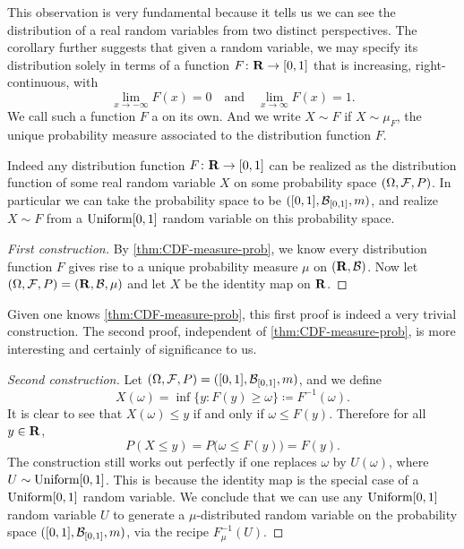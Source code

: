 This observation is very fundamental because it tells us we can see the distribution of a real random variables from two distinct perspectives. The corollary further suggests that given a random variable, we may specify its distribution solely in terms of a function $F\colon \mathbf{R} \to [0,1]$ that is increasing, right-continuous, with \[
        \lim_{x \to -\infty} F(x) = 0\quad \text{and} \quad \lim_{x \to \infty} F(x) = 1.
\] We call such a function $F$ a  on its own. And we write $X \sim F$ if $X \sim \mu_F$, the unique probability measure associated to the distribution function $F$.

\begin{thm} \label{thm:cdf-unif-identification}
    Indeed any distribution function $F \colon \mathbf{R} \to [0,1]$ can be realized as the distribution function of some real random variable $X$ on some probability space $(\Omega,\mathcal{F},P)$. In particular we can take the probability space to be $([0,1],\mathcal{B}_{[0,1]},m)$, and realize $X \sim F$ from a $\operatorname{Uniform}[0,1]$ random variable on this probability space.
\end{thm}
\begin{proof}[First construction]
    By \cref{thm:CDF-measure-prob}, we know every distribution function $F$ gives rise to a unique probability measure $\mu$ on $(\mathbf{R},\mathcal{B})$. Now let $(\Omega,\mathcal{F},P) = (\mathbf{R},\mathcal{B},\mu)$ and let $X$ be the identity map on $\mathbf{R}$.
\end{proof}
Given one knows \cref{thm:CDF-measure-prob}, this first proof is indeed a very trivial construction. The second proof, independent of \cref{thm:CDF-measure-prob}, is more interesting and certainly of significance to us.
\begin{proof}[Second construction]
    Let $(\Omega,\mathcal{F},P) = ([0,1],\mathcal{B}_{[0,1]},m)$, and we define \begin{equation}
        X(\omega) = \inf\{y : F(y) \geq \omega\} \coloneqq F^{-1}(\omega). \label{eq:dist-func-inv-def}
    \end{equation}
    It is clear to see that $X(\omega) \leq y$ if and only if $\omega \leq F(y)$. Therefore for all $y\in \mathbf{R}$, \[
        P(X \leq y) = P\bigl(\omega\leq F(y)\bigr) = F(y).
    \]
    The construction still works out perfectly if one replaces $\omega$ by $U(\omega)$, where $U \sim \operatorname{Uniform}[0,1]$. This is because the identity map is the special case of a $\operatorname{Uniform}[0,1]$ random variable. We conclude that we can use any $\operatorname{Uniform}[0,1]$ random variable $U$ to generate a $\mu$-distributed random variable on the probability space $([0,1],\mathcal{B}_{[0,1]},m)$, via the recipe $F_\mu^{-1}(U)$.
\end{proof}

